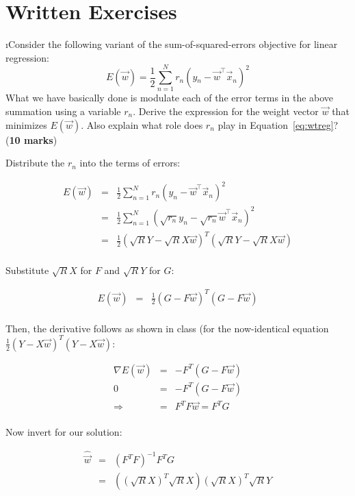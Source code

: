 \documentclass[fleqn]{article}
\begin{document}

\section{Written Exercises}

\bee

\i Consider the following variant of the sum-of-squared-errors objective for linear
regression:
\textsc{\begin{equation}
 E(\vec{w}) = \frac{1}{2}\sum_{n=1}^N r_n(y_n - \vec{w}^\top\vec{x}_n)^2
\label{eq:wtreg}
\end{equation}}
What we have basically done is modulate each of the error terms in 
the above summation using a variable $r_n$. Derive the expression 
for the weight vector $\vec{w}$ that minimizes $E(\vec{w})$. Also 
explain what role does $r_n$ play in Equation~\ref{eq:wtreg}?
(\textbf{10 marks})

\begin{solution}

Distribute the $r_n$ into the terms of errors:

\begin{eqnarray*}
 E(\vec{w}) & = & \frac{1}{2}\sum_{n=1}^N r_n(y_n - \vec{w}^\top\vec{x}_n)^2 \\
 & = & \frac{1}{2}\sum_{n=1}^N (\sqrt{r_n} y_n - \sqrt{r_n} \vec{w}^\top\vec{x}_n)^2 \\
& = & \frac{1}{2} (\sqrt{R} Y - \sqrt{R} X\vec{w})^T (\sqrt{R} Y - \sqrt{R} X\vec{w}) \\
\end{eqnarray*}

Substitute $\sqrt{R}X$ for $F$ and $\sqrt{R}Y$ for $G$:

\begin{eqnarray*}
 E(\vec{w}) & = & \frac{1}{2} (G - F\vec{w})^T (G - F\vec{w}) \\
\end{eqnarray*}

Then, the derivative follows as shown in class (for the now-identical equation $\frac{1}{2} (Y-X\vec{w})^T (Y-X\vec{w})$:

\begin{eqnarray*}
\nabla E(\vec{w}) & = & - F^T (G - F \vec{w}) \\
0 & = & - F^T (G - F \vec{w}) \\
\Rightarrow & = & F^T F \vec{w} = F^T G \\
\end{eqnarray*}

Now invert for our solution:

\begin{eqnarray*}
\hat{\vec{w}} & = & (F^T F)^{-1} F^T G \\
& = & ((\sqrt{R}X)^T \sqrt{R}X) (\sqrt{R}X)^T \sqrt{R}Y \\
\end{eqnarray*}

\end{solution}
\end{document}
